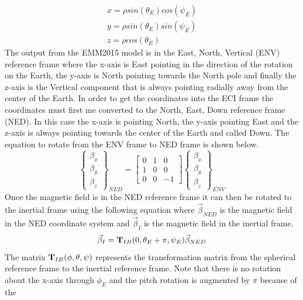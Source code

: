 \begin{equation}
\begin{matrix}
x = \rho sin(\theta_E) cos(\psi_E)\\
y = \rho sin(\theta_E) sin(\psi_E)\\
z = \rho cos(\theta_E)
\end{matrix}
\end{equation}
The output from the EMM2015 model is in the East, North, Vertical (ENV) reference frame
where the x-axis is East pointing in the direction of the rotation on
the Earth, the y-axis is North pointing towards the North pole and
finally the z-axis is the Vertical component that is always pointing
radially away from the center of the Earth. In order to get the
coordinates into the ECI frame the coordinates must first me converted
to the North, East, Down reference frame (NED). In this case the
x-axis is pointing North, the y-axis pointing East and the z-axis is
always pointing towards the center of the Earth and called Down. The
equation to rotate from the ENV frame to NED frame is shown below.
\begin{equation}
  \begin{Bmatrix} \beta_x \\ \beta_y \\ \beta_z \end{Bmatrix}_{NED}
  = \begin{bmatrix} 0 & 1 & 0 \\ 1 & 0 & 0 \\ 0 & 0 & -1 \end{bmatrix} \begin{Bmatrix} \beta_x \\ \beta_y \\ \beta_z \end{Bmatrix}_{ENV}
\end{equation}
Once the magnetic field is in the NED reference frame it can then be
rotated to the inertial frame using the following equation where $\vec{\beta}_{NED}$ is the
magnetic field in the NED coordinate system and $\vec{\beta}_I$ is the
magnetic field in the inertial frame. 
\begin{equation}\label{e:sph_inertial}
  \vec{\beta}_I = {\bf T}_{IB}(0,\theta_E+\pi,\psi_E)\vec{\beta}_{NED}
\end{equation}
The matrix ${\bf T}_{IB}(\phi,\theta,\psi)$ represents the transformation
matrix from the spherical reference frame to the inertial reference
frame. Note that there is no rotation about the x-axis through
$\phi_E$ and the pitch rotation is augmented by $\pi$ because of the
